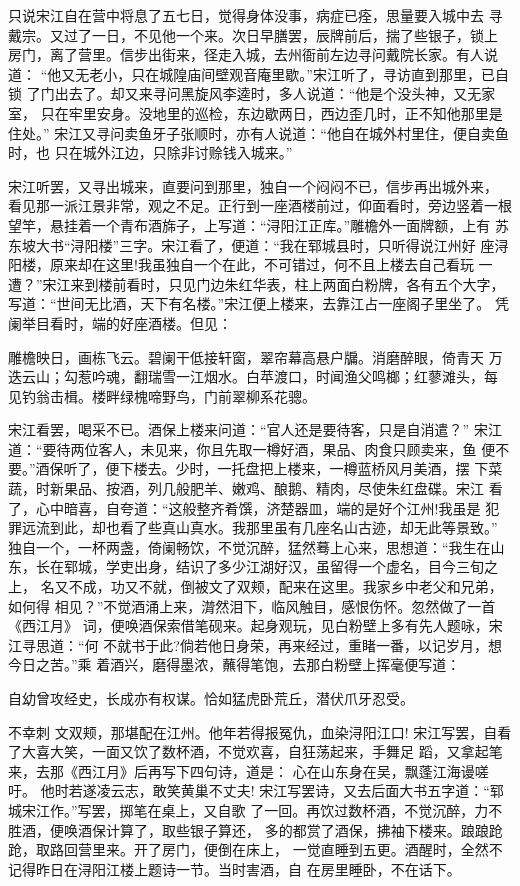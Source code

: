 只说宋江自在营中将息了五七日，觉得身体没事，病症已痊，思量要入城中去
寻戴宗。又过了一日，不见他一个来。次日早膳罢，辰牌前后，揣了些银子，锁上
房门，离了营里。信步出街来，径走入城，去州衙前左边寻问戴院长家。有人说道：
“他又无老小，只在城隍庙间壁观音庵里歇。”宋江听了，寻访直到那里，已自锁
了门出去了。却又来寻问黑旋风李逵时，多人说道：“他是个没头神，又无家室，
只在牢里安身。没地里的巡检，东边歇两日，西边歪几时，正不知他那里是住处。”
宋江又寻问卖鱼牙子张顺时，亦有人说道：“他自在城外村里住，便自卖鱼时，也
只在城外江边，只除非讨赊钱入城来。”

宋江听罢，又寻出城来，直要问到那里，独自一个闷闷不已，信步再出城外来，
看见那一派江景非常，观之不足。正行到一座酒楼前过，仰面看时，旁边竖着一根
望竿，悬挂着一个青布酒旆子，上写道：“浔阳江正库。”雕檐外一面牌额，上有
苏东坡大书“浔阳楼”三字。宋江看了，便道：“我在郓城县时，只听得说江州好
座浔阳楼，原来却在这里!我虽独自一个在此，不可错过，何不且上楼去自己看玩
一遭？”宋江来到楼前看时，只见门边朱红华表，柱上两面白粉牌，各有五个大字，
写道：“世间无比酒，天下有名楼。”宋江便上楼来，去靠江占一座阁子里坐了。
凭阑举目看时，端的好座酒楼。但见：

雕檐映日，画栋飞云。碧阑干低接轩窗，翠帘幕高悬户牖。消磨醉眼，倚青天
万迭云山；勾惹吟魂，翻瑞雪一江烟水。白苹渡口，时闻渔父鸣榔；红蓼滩头，每
见钓翁击楫。楼畔绿槐啼野鸟，门前翠柳系花骢。

宋江看罢，喝采不已。酒保上楼来问道：“官人还是要待客，只是自消遣？”
宋江道：“要待两位客人，未见来，你且先取一樽好酒，果品、肉食只顾卖来，鱼
便不要。”酒保听了，便下楼去。少时，一托盘把上楼来，一樽蓝桥风月美酒，摆
下菜蔬，时新果品、按酒，列几般肥羊、嫩鸡、酿鹅、精肉，尽使朱红盘碟。宋江
看了，心中暗喜，自夸道：“这般整齐肴馔，济楚器皿，端的是好个江州!我虽是
犯罪远流到此，却也看了些真山真水。我那里虽有几座名山古迹，却无此等景致。”
独自一个，一杯两盏，倚阑畅饮，不觉沉醉，猛然蓦上心来，思想道：“我生在山
东，长在郓城，学吏出身，结识了多少江湖好汉，虽留得一个虚名，目今三旬之上，
名又不成，功又不就，倒被文了双颊，配来在这里。我家乡中老父和兄弟，如何得
相见？”不觉酒涌上来，潸然泪下，临风触目，感恨伤怀。忽然做了一首《西江月》
词，便唤酒保索借笔砚来。起身观玩，见白粉壁上多有先人题咏，宋江寻思道：“何
不就书于此?倘若他日身荣，再来经过，重睹一番，以记岁月，想今日之苦。”乘
着酒兴，磨得墨浓，蘸得笔饱，去那白粉壁上挥毫便写道：

自幼曾攻经史，长成亦有权谋。恰如猛虎卧荒丘，潜伏爪牙忍受。

不幸刺
文双颊，那堪配在江州。他年若得报冤仇，血染浔阳江口!
宋江写罢，自看了大喜大笑，一面又饮了数杯酒，不觉欢喜，自狂荡起来，手舞足
蹈，又拿起笔来，去那《西江月》后再写下四句诗，道是：
心在山东身在吴，飘蓬江海谩嗟吁。
他时若遂凌云志，敢笑黄巢不丈夫!
宋江写罢诗，又去后面大书五字道：“郓城宋江作。”写罢，掷笔在桌上，又自歌
了一回。再饮过数杯酒，不觉沉醉，力不胜酒，便唤酒保计算了，取些银子算还，
多的都赏了酒保，拂袖下楼来。踉踉跄跄，取路回营里来。开了房门，便倒在床上，
一觉直睡到五更。酒醒时，全然不记得昨日在浔阳江楼上题诗一节。当时害酒，自
在房里睡卧，不在话下。

